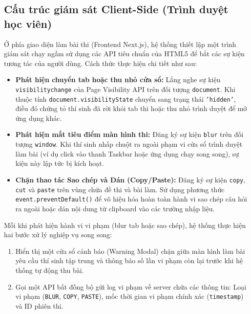 \documentclass[../DoAn.tex]{subfiles}
\begin{document}
\subsection{Cấu trúc giám sát Client-Side (Trình duyệt học viên)}
Ở phía giao diện làm bài thi (Frontend Next.js), hệ thống thiết lập một trình giám sát chạy ngầm sử dụng các API tiêu chuẩn của HTML5 để bắt các sự kiện tương tác của người dùng. Cách thức thực hiện chi tiết như sau:
\begin{itemize}
    \item \textbf{Phát hiện chuyển tab hoặc thu nhỏ cửa sổ:} Lắng nghe sự kiện \texttt{visibilitychange} của Page Visibility API trên đối tượng \texttt{document}. Khi thuộc tính \texttt{document.visibilityState} chuyển sang trạng thái \texttt{'hidden'}, điều đó chứng tỏ thí sinh đã rời khỏi tab thi hoặc thu nhỏ trình duyệt để mở ứng dụng khác.
    \item \textbf{Phát hiện mất tiêu điểm màn hình thi:} Đăng ký sự kiện \texttt{blur} trên đối tượng \texttt{window}. Khi thí sinh nhấp chuột ra ngoài phạm vi cửa sổ trình duyệt làm bài (ví dụ click vào thanh Taskbar hoặc ứng dụng chạy song song), sự kiện này lập tức bị kích hoạt.
    \item \textbf{Chặn thao tác Sao chép và Dán (Copy/Paste):} Đăng ký sự kiện \texttt{copy}, \texttt{cut} và \texttt{paste} trên vùng chứa đề thi và bài làm. Sử dụng phương thức \texttt{event.preventDefault()} để vô hiệu hóa hoàn toàn hành vi sao chép câu hỏi ra ngoài hoặc dán nội dung từ clipboard vào các trường nhập liệu.
\end{itemize}

Mỗi khi phát hiện hành vi vi phạm (blur tab hoặc sao chép), hệ thống thực hiện hai bước xử lý nghiệp vụ song song:
\begin{enumerate}
    \item Hiển thị một cửa sổ cảnh báo (Warning Modal) chặn giữa màn hình làm bài yêu cầu thí sinh tập trung và thông báo số lần vi phạm còn lại trước khi hệ thống tự động thu bài.
    \item Gọi một API bất đồng bộ gửi log vi phạm về server chứa các thông tin: Loại vi phạm (\texttt{BLUR}, \texttt{COPY}, \texttt{PASTE}), mốc thời gian vi phạm chính xác (\texttt{timestamp}) và ID phiên thi.
\end{enumerate}
\end{document}
